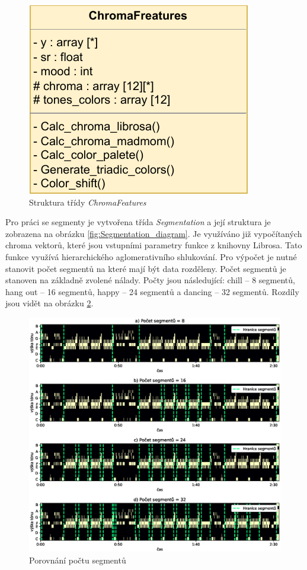 \begin{figure}[H]
    \centering
        \includegraphics[width = 0.3\linewidth]{obrazky/UML_diagram_ChromaFeatures.pdf}
        \caption{Struktura třídy \textit{ChromaFeatures}}
        \label{fig:ChromaFeatures_class_diagram}
\end{figure}

Pro práci se segmenty je vytvořena třída \textit{Segmentation} a její struktura je zobrazena na obrázku \ref{fig:Segmentation_diagram}. Je využíváno již vypočítaných chroma vektorů, které jsou vstupními parametry funkce z knihovny Librosa. Tato funkce využívá hierarchického aglomerativního shlukování. Pro výpočet je nutné stanovit počet segmentů na které mají být data rozděleny. Počet segmentů je stanoven na základně zvolené nálady. Počty jsou následující: chill -- 8 segmentů, hang out -- 16 segmentů, happy -- 24 segmentů a dancing -- 32 segmentů. Rozdíly jsou vidět na obrázku \ref{fig:Segmentation_segments_comparison}.

\begin{figure}[H]
    \centering
    \includegraphics[width = 1\linewidth]{obrazky/Segmentation_segments_comparisons.eps}
    \caption{Porovnání počtu segmentů}
    \label{fig:Segmentation_segments_comparison}
\end{figure}

